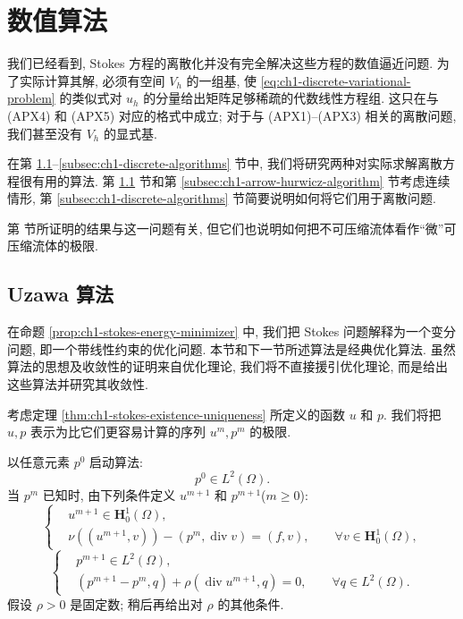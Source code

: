 \clearpage
\section{数值算法}
\label{sec:ch1-numerical-algorithms}

我们已经看到, Stokes 方程的离散化并没有完全解决这些方程的数值逼近问题. 为了实际计算其解, 必须有空间 $V_h$ 的一组基, 使 
\eqref{eq:ch1-discrete-variational-problem} 的类似式对 $u_h$ 的分量给出矩阵足够稀疏的代数线性方程组. 这只在与 (APX4) 和 (APX5) 对应的格式中成立; 对于与 (APX1)--(APX3) 相关的离散问题, 我们甚至没有 $V_h$ 的显式基.

在第 \ref{subsec:ch1-uzawa-algorithm}--\ref{subsec:ch1-discrete-algorithms} 节中, 我们将研究两种对实际求解离散方程很有用的算法. 第 \ref{subsec:ch1-uzawa-algorithm} 节和第 \ref{subsec:ch1-arrow-hurwicz-algorithm} 节考虑连续情形, 第 \ref{subsec:ch1-discrete-algorithms} 节简要说明如何将它们用于离散问题.

第  节所证明的结果与这一问题有关, 但它们也说明如何把不可压缩流体看作``微''可压缩流体的极限.

\subsection{Uzawa 算法}
\label{subsec:ch1-uzawa-algorithm}

在命题 \ref{prop:ch1-stokes-energy-minimizer} 中, 我们把 Stokes 问题解释为一个变分问题, 即一个带线性约束的优化问题. 本节和下一节所述算法是经典优化算法. 虽然算法的思想及收敛性的证明来自优化理论, 我们将不直接援引优化理论, 而是给出这些算法并研究其收敛性.

考虑定理 \ref{thm:ch1-stokes-existence-uniqueness} 所定义的函数 $u$ 和 $p$. 我们将把 $u,p$ 表示为比它们更容易计算的序列 $u^m,p^m$ 的极限.

以任意元素 $p^0$ 启动算法:
\begin{equation}
p^0\in L^2(\Omega).
\label{eq:ch1-uzawa-initial-pressure}
\end{equation}
当 $p^m$ 已知时, 由下列条件定义 $u^{m+1}$ 和 $p^{m+1}$($m\geq0$):
\begin{equation}
\left\{
\begin{aligned}
&u^{m+1}\in\mathbf H_0^1(\Omega),\\
&\nu((u^{m+1},v))-(p^m,\operatorname{div}v)=(f,v),
\qquad \forall v\in\mathbf H_0^1(\Omega),
\end{aligned}
\right.
\label{eq:ch1-uzawa-velocity-step}
\end{equation}
\begin{equation}
\left\{
\begin{aligned}
&p^{m+1}\in L^2(\Omega),\\
&(p^{m+1}-p^m,q)+\rho(\operatorname{div}u^{m+1},q)=0,
\qquad \forall q\in L^2(\Omega).
\end{aligned}
\right.
\label{eq:ch1-uzawa-pressure-step}
\end{equation}
假设 $\rho>0$ 是固定数; 稍后再给出对 $\rho$ 的其他条件.

